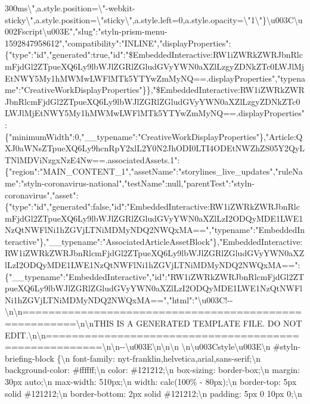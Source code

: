 300ms\textbackslash{}",a.style.position=\textbackslash{}"-webkit-sticky\textbackslash{}",a.style.position=\textbackslash{}"sticky\textbackslash{}",a.style.left=0,a.style.opacity=\textbackslash{}"1\textbackslash{}"\}\textbackslash{}u003C\textbackslash{}u002Fscript\textbackslash{}u003E","slug":"styln-prism-menu-1592847958612","compatibility":"INLINE","displayProperties":\{"type":"id","generated":true,"id":"\$EmbeddedInteractive:RW1iZWRkZWRJbnRlcmFjdGl2ZTpueXQ6Ly9lbWJlZGRlZGludGVyYWN0aXZlLzgyZDNkZTc0LWJlMjEtNWY5My1hMWMwLWFlMTk5YTYwZmMyNQ==.displayProperties","typename":"CreativeWorkDisplayProperties"\}\},"\$EmbeddedInteractive:RW1iZWRkZWRJbnRlcmFjdGl2ZTpueXQ6Ly9lbWJlZGRlZGludGVyYWN0aXZlLzgyZDNkZTc0LWJlMjEtNWY5My1hMWMwLWFlMTk5YTYwZmMyNQ==.displayProperties":\{"minimumWidth":0,"\_\_typename":"CreativeWorkDisplayProperties"\},"Article:QXJ0aWNsZTpueXQ6Ly9hcnRpY2xlL2Y0N2JhODI0LTI4ODEtNWZhZS05Y2QyLTNlMDViNzgxNzE4Nw==.associatedAssets.1":\{"region":"MAIN\_CONTENT\_1","assetName":"storylines\_live\_updates","ruleName":"styln-coronavirus-national","testName":null,"parentTest":"styln-coronavirus","asset":\{"type":"id","generated":false,"id":"EmbeddedInteractive:RW1iZWRkZWRJbnRlcmFjdGl2ZTpueXQ6Ly9lbWJlZGRlZGludGVyYWN0aXZlLzI2ODQyMDE1LWE1NzQtNWFlNi1hZGVjLTNiMDMyNDQ2NWQxMA==","typename":"EmbeddedInteractive"\},"\_\_typename":"AssociatedArticleAssetBlock"\},"EmbeddedInteractive:RW1iZWRkZWRJbnRlcmFjdGl2ZTpueXQ6Ly9lbWJlZGRlZGludGVyYWN0aXZlLzI2ODQyMDE1LWE1NzQtNWFlNi1hZGVjLTNiMDMyNDQ2NWQxMA==":\{"\_\_typename":"EmbeddedInteractive","id":"RW1iZWRkZWRJbnRlcmFjdGl2ZTpueXQ6Ly9lbWJlZGRlZGludGVyYWN0aXZlLzI2ODQyMDE1LWE1NzQtNWFlNi1hZGVjLTNiMDMyNDQ2NWQxMA==","html":"\textbackslash{}u003C!-\/-\textbackslash{}n\textbackslash{}n======================================================\textbackslash{}n\textbackslash{}nTHIS
IS A GENERATED TEMPLATE FILE. DO NOT
EDIT.\textbackslash{}n\textbackslash{}n======================================================\textbackslash{}n\textbackslash{}n-\/-\textbackslash{}u003E\textbackslash{}n\textbackslash{}n\textbackslash{}n
\textbackslash{}n\textbackslash{}u003Cstyle\textbackslash{}u003E\textbackslash{}n
\#styln-briefing-block \{\textbackslash{}n font-family:
nyt-franklin,helvetica,arial,sans-serif;\textbackslash{}n
background-color: \#ffffff;\textbackslash{}n color:
\#121212;\textbackslash{}n box-sizing: border-box;\textbackslash{}n
margin: 30px auto;\textbackslash{}n max-width: 510px;\textbackslash{}n
width: calc(100\% - 80px);\textbackslash{}n border-top: 5px solid
\#121212;\textbackslash{}n border-bottom: 2px solid
\#121212;\textbackslash{}n padding: 5px 0 10px 0;\textbackslash{}n
